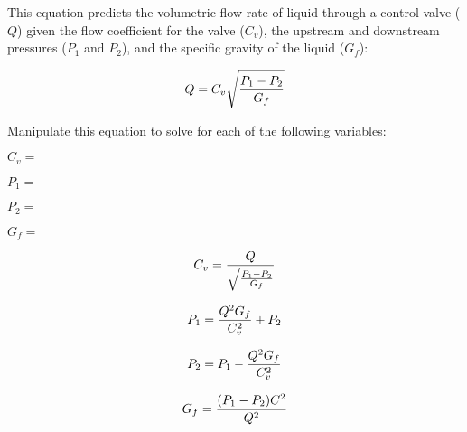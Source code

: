 

This equation predicts the volumetric flow rate of liquid through a control valve ($Q$) given the flow coefficient for the valve ($C_v$), the upstream and downstream pressures ($P_1$ and $P_2$), and the specific gravity of the liquid ($G_f$):

$$Q = C_v \sqrt{P_1 - P_2 \over G_f}$$

Manipulate this equation to solve for each of the following variables:

\vskip 10pt

$C_v =$

\vskip 10pt

$P_1 =$

\vskip 10pt

$P_2 =$

\vskip 10pt

$G_f =$

\vskip 10pt







$$C_v = {Q \over \sqrt{P_1 - P_2 \over G_f}}$$

\vskip 20pt

$$P_1 = {Q^2 G_f \over C_v^2} + P_2$$

\vskip 20pt

$$P_2 = P_1 - {Q^2 G_f \over C_v^2}$$

\vskip 20pt

$$G_f = {(P_1 - P_2) C^2 \over Q^2}$$











